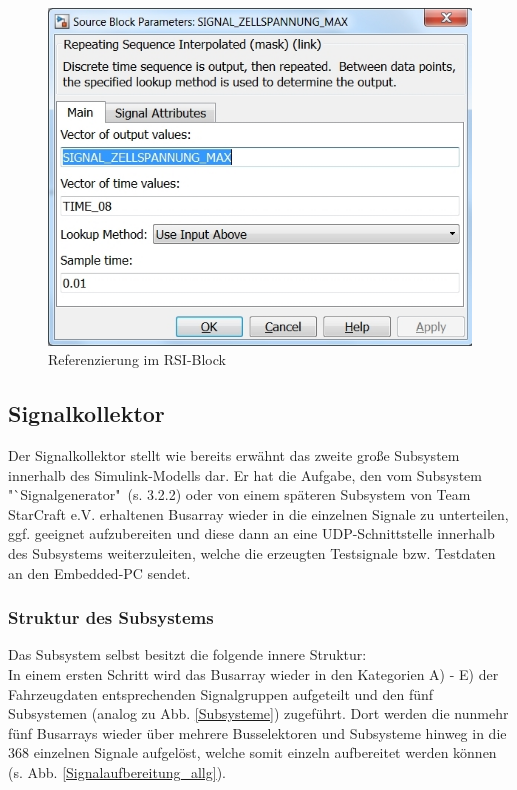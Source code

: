 \documentclass[fontsize = 12pt, paper = a4]{scrreprt}
\begin{document}
\begin{figure}[h]
\centering
\includegraphics[scale = 0.55]{referenz}
\caption[Referenzierung der Config-Datei]{Referenzierung im RSI-Block}
\label{Ref. RSI}
\end{figure}

\newpage

\subsection{Signalkollektor}

Der Signalkollektor stellt wie bereits erwähnt das zweite große Subsystem innerhalb des Simulink-Modells dar. Er hat die Aufgabe, den vom Subsystem "`Signalgenerator"\ (s. 3.2.2) oder von einem späteren Subsystem von Team StarCraft e.V. erhaltenen Busarray wieder in die einzelnen Signale zu unterteilen, ggf. geeignet aufzubereiten und diese dann an eine UDP-Schnittstelle innerhalb des Subsystems weiterzuleiten, welche die erzeugten Testsignale bzw. Testdaten an den Embedded-PC sendet.  

\subsubsection{Struktur des Subsystems}

Das Subsystem selbst besitzt die folgende innere Struktur: \\
In einem ersten Schritt wird das Busarray wieder in den Kategorien A) - E) der Fahrzeugdaten entsprechenden Signalgruppen aufgeteilt und den fünf Subsystemen (analog zu Abb. \ref{Subsysteme}) zugeführt. Dort werden die nunmehr fünf Busarrays wieder über mehrere Busselektoren und Subsysteme hinweg in die 368 einzelnen Signale aufgelöst, welche somit einzeln aufbereitet werden können (s. Abb. \ref{Signalaufbereitung_allg}). \\
\end{document}
